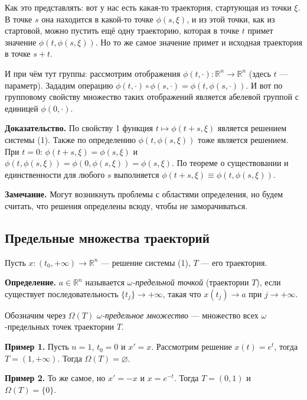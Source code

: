 \begin{enumerate}
        Как это представлять: вот у нас есть какая-то траектория, стартующая из точки $\xi$.
        В точке $s$ она находится в какой-то точке $\phi(s, \xi)$, и из этой точки, как из стартовой, можно пустить ещё одну траекторию, которая в точке $t$ примет значение $\phi(t, \phi(s, \xi))$.
        Но то же самое значение примет и исходная траектория в точке $s + t$.

        И при чём тут группы: рассмотрим отображения $\phi(t, \cdot): \mathbb R^n \to \mathbb R^n$ (здесь $t$ --- параметр).
        Зададим операцию $\phi(t, \cdot) \circ \phi(s, \cdot) = \phi(t, \phi(s, \cdot))$.
        И вот по групповому свойству множество таких отображений является абелевой группой с единицей $\phi(0, \cdot)$.

        \textbf{Доказательство.} По свойству 1 функция $t \mapsto \phi(t + s, \xi)$ является решением системы (1).
        Также по определению $\phi(t, \phi(s, \xi))$ тоже является решением.
        При $t = 0$: $\phi(t + s, \xi) = \phi(s, \xi)$ и $\phi(t, \phi(s, \xi)) = \phi(0, \phi(s, \xi)) = \phi(s, \xi)$.
        По теореме о существовании и единственности для любого $s$ выполняется $\phi(t + s, \xi) \equiv \phi(t, \phi(s, \xi))$.

        \QED

        \textbf{Замечание.} Могут возникнуть проблемы с областями определения, но будем считать, что решения определены всюду, чтобы не заморачиваться.

\end{enumerate}

\subsection{Предельные множества траекторий}
Пусть $x: (t_0, +\infty) \to \mathbb R^n$ --- решение системы (1), $T$ --- его траектория.

\textbf{Определение.} $a \in \mathbb R^n$ называется \textit{$\omega$-предельной точкой} (траектории $T$), если существует последовательность $\{t_j\} \to +\infty$, такая что $x(t_j) \to a$ при $j \to +\infty$.

Обозначим через $\Omega(T)$ \textit{$\omega$-предельное множество} --- множество всех $\omega$-предельных точек траектории $T$.

\textbf{Пример 1.} Пусть $n = 1$, $t_0 = 0$ и $x' = x$.
Рассмотрим решение $x(t) = e^t$, тогда $T = (1, +\infty)$.
Тогда $\Omega(T) = \varnothing$.

\textbf{Пример 2.} То же самое, но $x' = -x$ и $x = e^{-t}$.
Тогда $T = (0, 1)$ и $\Omega(T) = \{0\}$.

